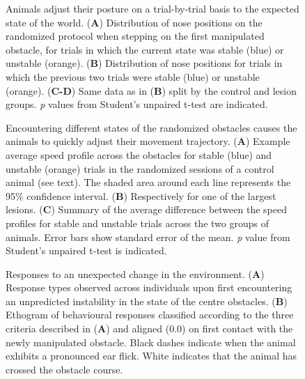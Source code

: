 \begin{figure}
\centering

\caption{Animals adjust their posture on a trial-by-trial basis to the expected state of the world. (\textbf{A}) Distribution of nose positions on the randomized protocol when stepping on the first manipulated obstacle, for trials in which the current state was stable (blue) or unstable (orange). (\textbf{B}) Distribution of nose positions for trials in which the previous two trials were stable (blue) or unstable (orange). (\textbf{C-D}) Same data as in (\textbf{B}) split by the control and lesion groups. \emph{p} values from Student's unpaired t-test are indicated.}
\label{fig:random}
\end{figure}

\begin{figure}
\centering

\caption{Encountering different states of the randomized obstacles causes the animals to quickly adjust their movement trajectory. (\textbf{A}) Example average speed profile across the obstacles for stable (blue) and unstable (orange) trials in the randomized sessions of a control animal (see text). The shaded area around each line represents the 95\% confidence interval. (\textbf{B}) Respectively for one of the largest lesions. (\textbf{C}) Summary of the average difference between the speed profiles for stable and unstable trials across the two groups of animals. Error bars show standard error of the mean. \emph{p} value from Student's unpaired t-test is indicated.}
\label{fig:speed}
\end{figure}

\begin{figure}
\centering

\caption{Responses to an unexpected change in the environment. (\textbf{A}) Response types observed across individuals upon first encountering an unpredicted instability in the state of the centre obstacles. (\textbf{B}) Ethogram of behavioural responses classified according to the three criteria described in (\textbf{A}) and aligned (0.0) on first contact with the newly manipulated obstacle. Black dashes indicate when the animal exhibits a pronounced ear flick. White indicates that the animal has crossed the obstacle course.}
\label{fig:ethogram}
\end{figure}
